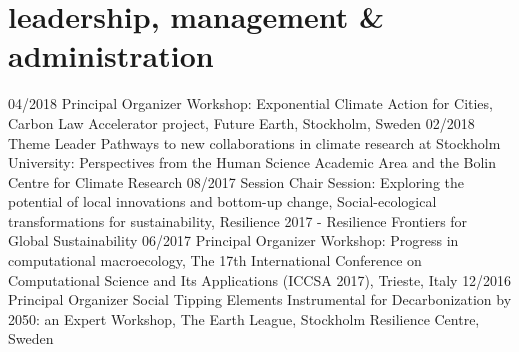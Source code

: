 \documentclass[]{friggeri-cv} %
\begin{document}
\section{leadership, management \& administration}

\begin{entrylist}
\entry
{\small{04/2018}}
{Principal Organizer}
{}
{Workshop: Exponential Climate Action for Cities, Carbon Law Accelerator project, Future Earth, Stockholm, Sweden}
\entry
{\small{02/2018}}
{Theme Leader}
{}
{Pathways to new collaborations in climate research at Stockholm University: Perspectives from the Human Science Academic Area and the Bolin Centre for Climate Research}
\entry
{\small{08/2017}}
{Session Chair}
{}
{Session: Exploring the potential of local innovations and bottom-up change, Social-ecological transformations for sustainability, Resilience 2017 - Resilience Frontiers for Global Sustainability}
\entry
{\small{06/2017}}
{Principal Organizer}
{}
{Workshop: Progress in computational macroecology, The 17th International Conference on Computational Science and Its Applications (ICCSA 2017), Trieste, Italy}
\entry
{\small{12/2016}}
{Principal Organizer}
{}
{Social Tipping Elements Instrumental for Decarbonization by 2050: an Expert Workshop, The Earth League, Stockholm Resilience Centre, Sweden}
\end{entrylist}
\end{document}
